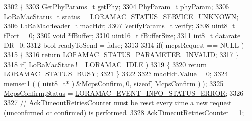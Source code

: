 \begin{DoxyCode}
3302 \{
3303     \mbox{\hyperlink{structs_get_phy_params}{GetPhyParams\_t}} getPhy;
3304     \mbox{\hyperlink{unionu_phy_param}{PhyParam\_t}} phyParam;
3305     \mbox{\hyperlink{group___l_o_r_a_m_a_c_ga30bd25657e10480f8605ee951b0ecfbd}{LoRaMacStatus\_t}} status = \mbox{\hyperlink{group___l_o_r_a_m_a_c_gga1d18f26b344040b3ec5c3db662919661aff502a87db22d6a9a4919e4b54c7c1cf}{LORAMAC\_STATUS\_SERVICE\_UNKNOWN}};
3306     \mbox{\hyperlink{unionu_lo_ra_mac_header}{LoRaMacHeader\_t}} macHdr;
3307     \mbox{\hyperlink{unionu_verify_params}{VerifyParams\_t}} verify;
3308     uint8\_t fPort = 0;
3309     \textcolor{keywordtype}{void} *fBuffer;
3310     uint16\_t fBufferSize;
3311     int8\_t datarate = \mbox{\hyperlink{group___r_e_g_i_o_n_ga6c4ef966b4f3d5eb7597b087f2b97095}{DR\_0}};
3312     \textcolor{keywordtype}{bool} readyToSend = \textcolor{keyword}{false};
3313 
3314     \textcolor{keywordflow}{if}( mcpsRequest == NULL )
3315     \{
3316         \textcolor{keywordflow}{return} \mbox{\hyperlink{group___l_o_r_a_m_a_c_gga1d18f26b344040b3ec5c3db662919661ad0d3119f247d00e1787dda106fcb3017}{LORAMAC\_STATUS\_PARAMETER\_INVALID}};
3317     \}
3318     \textcolor{keywordflow}{if}( \mbox{\hyperlink{_lo_ra_mac_8c_a53bc4ca09907ed24a1be62fa76c310ca}{LoRaMacState}} != \mbox{\hyperlink{_lo_ra_mac_8c_ada0bdc03d52b5bf536f021dcea7c4490a3af5105c630ff1cfa443789cfa2f318c}{LORAMAC\_IDLE}} )
3319     \{
3320         \textcolor{keywordflow}{return} \mbox{\hyperlink{group___l_o_r_a_m_a_c_gga1d18f26b344040b3ec5c3db662919661a66b12f569207eacd97ee1c1d6c4cee6d}{LORAMAC\_STATUS\_BUSY}};
3321     \}
3322 
3323     macHdr.\mbox{\hyperlink{unionu_lo_ra_mac_header_a88f4d00bdab99ae6f48c7ae0bc468bb4}{Value}} = 0;
3324     \mbox{\hyperlink{utilities_8c_a272ed6d691263d9762c98ed720b1fa3a}{memset1}} ( ( uint8\_t* ) &\mbox{\hyperlink{_lo_ra_mac_8c_a4d002492bf36a1dbb2a117e502bf7976}{McpsConfirm}}, 0, \textcolor{keyword}{sizeof}( 
      \mbox{\hyperlink{_lo_ra_mac_8c_a4d002492bf36a1dbb2a117e502bf7976}{McpsConfirm}} ) );
3325     \mbox{\hyperlink{_lo_ra_mac_8c_a4d002492bf36a1dbb2a117e502bf7976}{McpsConfirm}}.\mbox{\hyperlink{structs_mcps_confirm_ab360e499d5a7a9e0aa7b4df7239633b5}{Status}} = \mbox{\hyperlink{group___l_o_r_a_m_a_c_gga3c4e7a774e25faf1606f577ee5e7d201a613ed77c0e8416a512224fffdbfdf6c1}{LORAMAC\_EVENT\_INFO\_STATUS\_ERROR}};
3326 
3327     \textcolor{comment}{// AckTimeoutRetriesCounter must be reset every time a new request (unconfirmed or confirmed) is
       performed.}
3328     \mbox{\hyperlink{_lo_ra_mac_8c_a58204fb51185bac418e22cbc582c1bf6}{AckTimeoutRetriesCounter}} = 1;

\end{DoxyCode}
